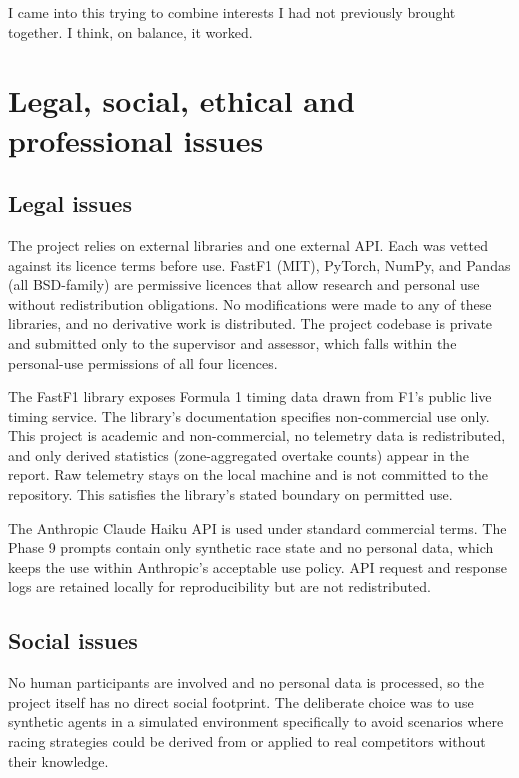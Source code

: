 \begin{appendices}
I came into this trying to combine interests I had not previously brought together. I think, on balance, it worked.

\section{Legal, social, ethical and professional issues}

\subsection{Legal issues}

The project relies on external libraries and one external API. Each was vetted against its licence terms before use. FastF1 (MIT), PyTorch, NumPy, and Pandas (all BSD-family) are permissive licences that allow research and personal use without redistribution obligations. No modifications were made to any of these libraries, and no derivative work is distributed. The project codebase is private and submitted only to the supervisor and assessor, which falls within the personal-use permissions of all four licences.

The FastF1 library exposes Formula 1 timing data drawn from F1's public live timing service. The library's documentation specifies non-commercial use only. This project is academic and non-commercial, no telemetry data is redistributed, and only derived statistics (zone-aggregated overtake counts) appear in the report. Raw telemetry stays on the local machine and is not committed to the repository. This satisfies the library's stated boundary on permitted use.

The Anthropic Claude Haiku API is used under standard commercial terms. The Phase 9 prompts contain only synthetic race state and no personal data, which keeps the use within Anthropic's acceptable use policy. API request and response logs are retained locally for reproducibility but are not redistributed.

\subsection{Social issues}

No human participants are involved and no personal data is processed, so the project itself has no direct social footprint. The deliberate choice was to use synthetic agents in a simulated environment specifically to avoid scenarios where racing strategies could be derived from or applied to real competitors without their knowledge.


\end{appendices}
